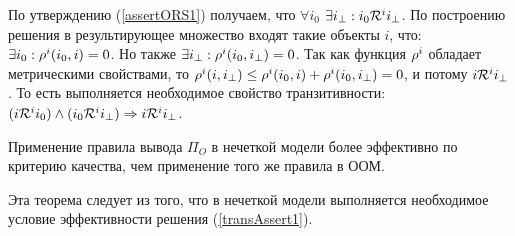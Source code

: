 По утверждению (\ref{assertORS1}) получаем, что $\forall i_0$ $\exists i_{\bot}: i_0
\mathcal{R}^i i_{\bot}$. По построению решения в результирующее множество входят такие
объекты $i$, что: $\exists i_0: {\mathcal{\rho}}^i(i_0, i) = 0$. Но также $\exists i_{\bot}:
{\mathcal{\rho}}^i(i_0, i_{\bot}) = 0$. Так как функция ${\mathcal{\rho}}^i$ обладает
метрическими свойствами, то ${\mathcal{\rho}}^i(i, i_{\bot}) \le {\mathcal{\rho}}^i(i_0, i) + {\mathcal{\rho}}^i(i_0,
i_{\bot}) = 0$, и потому $i \mathcal{R}^i i_{\bot}$. То есть выполняется
необходимое свойство транзитивности: $(i \mathcal{R}^i i_0) \wedge (i_0 \mathcal{R}^i i_{\bot})
\Rightarrow i \mathcal{R}^i i_{\bot}$.

\begin{trm}
	\label{trm:fuz-eff-oom}
	Применение правила вывода $\Pi_O$ в нечеткой модели более эффективно
	по критерию качества, чем применение того же правила в ООМ.
\end{trm}
Эта теорема следует из того, что в нечеткой модели выполняется
необходимое условие эффективности решения (\ref{transAssert1}).
%
%
%
